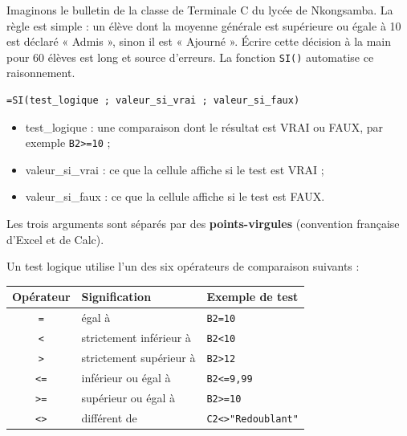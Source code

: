 \documentclass[11pt]{article}
\newcommand{\cle}[1]{{\popxbold\color{popdark}#1}}
\begin{document}
Imaginons le bulletin de la classe de Terminale C du lycée de Nkongsamba. La règle est simple : un élève dont la moyenne générale est supérieure ou égale à 10 est déclaré « Admis », sinon il est « Ajourné ». Écrire cette décision à la main pour 60 élèves est long et source d'erreurs. La fonction \texttt{SI()} automatise ce raisonnement.

\begin{propriete}
\begin{lstlisting}
=SI(test_logique ; valeur_si_vrai ; valeur_si_faux)
\end{lstlisting}
\begin{itemize}
  \item \cle{test\_logique} : une comparaison dont le résultat est VRAI ou FAUX, par exemple \texttt{B2>=10} ;
  \item \cle{valeur\_si\_vrai} : ce que la cellule affiche si le test est VRAI ;
  \item \cle{valeur\_si\_faux} : ce que la cellule affiche si le test est FAUX.
\end{itemize}
Les trois arguments sont séparés par des \textbf{points-virgules} (convention française d'Excel et de Calc).
\end{propriete}

Un test logique utilise l'un des six \cle{opérateurs de comparaison} suivants :

\begin{center}
\begin{tabularx}{\linewidth}{|c|l|X|}
\hline
\rowcolor{popblueL} \textbf{Opérateur} & \textbf{Signification} & \textbf{Exemple de test} \\
\hline
\texttt{=} & égal à & \texttt{B2=10} \\
\hline
\texttt{<} & strictement inférieur à & \texttt{B2<10} \\
\hline
\texttt{>} & strictement supérieur à & \texttt{B2>12} \\
\hline
\texttt{<=} & inférieur ou égal à & \texttt{B2<=9,99} \\
\hline
\texttt{>=} & supérieur ou égal à & \texttt{B2>=10} \\
\hline
\texttt{<>} & différent de & \texttt{C2<>"Redoublant"} \\
\hline
\end{tabularx}
\end{center}
\end{document}
